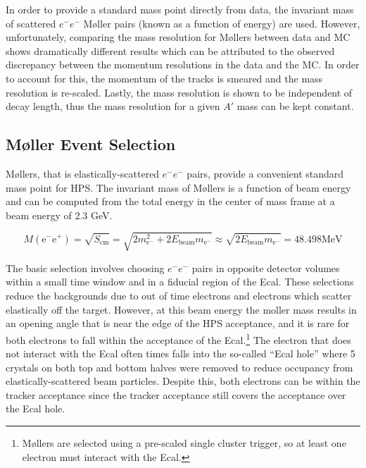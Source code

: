 In order to provide a standard mass point directly from data, the invariant mass of scattered $e^-e^-$ M\o ller pairs (known as a function of energy) are used. However, unfortunately, comparing the mass resolution for M\o llers between data and MC shows dramatically different results which can be attributed to the observed discrepancy between the momentum resolutions in the data and the MC. In order to account for this, the momentum of the tracks is smeared and the mass resolution is re-scaled. Lastly, the mass resolution is shown to be independent of decay length, thus the mass resolution for a given $A'$ mass can be kept constant.%

\subsection{M\o ller Event Selection}

M\o llers, that is elastically-scattered $e^-e^-$ pairs, provide a convenient standard mass point for HPS. The invariant mass of M\o llers is a function of beam energy and can be computed from the  total energy in the center of mass frame at a beam energy of 2.3 GeV.

\begin{equation}
    M(\mathrm{e}^{-}\mathrm{e}^{+}) = \sqrt{S_{\mathrm{cm}} } = \sqrt{ 2m_{\mathrm{e}^{-}}^{2} + 2E_{\mathrm{beam}}m_{\mathrm{e}^{-}} } \approx \sqrt{ 2E_{\mathrm{beam}}m_{\mathrm{e}^{-}} } = 48.498\mathrm{MeV}
    \label{eq:MlrCmEnergy}
\end{equation}


The basic selection involves choosing $e^-e^-$ pairs in opposite detector volumes within a small time window and in a fiducial region of the Ecal. These selections reduce the backgrounds due to out of time electrons and electrons which scatter elastically off the target. However, at this beam energy the moller mass results in an opening angle that is near the edge of the HPS acceptance, and it is rare for both electrons to fall within the acceptance of the Ecal.\footnote{M\o llers are selected using a pre-scaled single cluster trigger, so at least one electron must interact with the Ecal.} The electron that does not interact with the Ecal often times falls into the so-called ``Ecal hole'' where 5 crystals on both top and bottom halves were removed to reduce occupancy from elastically-scattered beam particles. Despite this, both electrons can be within the tracker acceptance since the tracker acceptance still covers the acceptance over the Ecal hole. 

